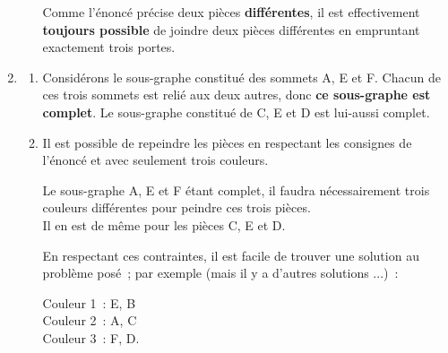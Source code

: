 \begin{corrige}
\begin{enumerate}
\begin{enumerate}[label=\alph*.]
               \par
               Comme l'énoncé précise deux pièces \textbf{différentes}, il est effectivement \textbf{toujours possible} de joindre deux pièces différentes en empruntant exactement trois portes.
          \end{enumerate}
          \par
          \item %
          \par
          \begin{enumerate}[label=\alph*.]
               \item %
               Considérons le sous-graphe constitué des sommets A, E et F. Chacun de ces trois sommets est relié aux deux autres, donc \textbf{ce sous-graphe est complet}. Le sous-graphe constitué de C, E et D est lui-aussi complet.
               \par
               \item %
               \par
               Il est possible de repeindre les pièces en respectant les consignes de l'énoncé et avec seulement trois couleurs.
               \par
               Le sous-graphe A, E et F étant complet, il faudra nécessairement trois couleurs différentes pour peindre ces trois pièces.\\
               Il en est de même pour les pièces C, E et D.
               \par
               En respectant ces contraintes, il est facile de trouver une solution au problème posé~; par exemple (mais il y a d'autres solutions ...)~:
               \par
               Couleur 1~: E, B\\
               Couleur 2~: A, C\\
               Couleur 3~: F, D.\\
               \par
          \end{enumerate}
     \end{enumerate}
\end{corrige}
